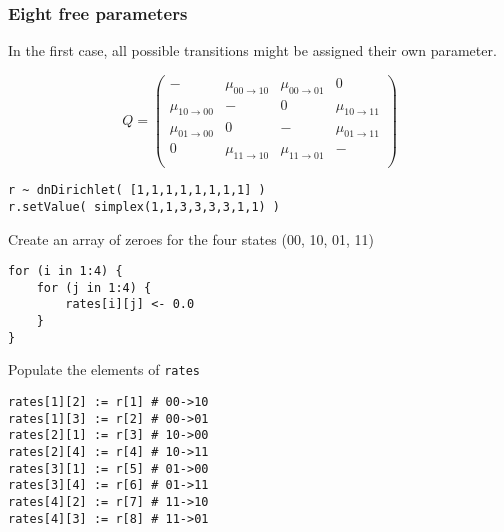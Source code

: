 \subsubsection{Eight free parameters}

In the first case, all possible transitions might be assigned their own parameter.

\begin{equation*}
Q = \begin{pmatrix}
                      - & \mu_{00 \rightarrow 10} & \mu_{00 \rightarrow 01} &                       0 \\
\mu_{10 \rightarrow 00} &                       - &                       0 & \mu_{10 \rightarrow 11} \\
\mu_{01 \rightarrow 00} &                       0 &                       - & \mu_{01 \rightarrow 11} \\
                      0 & \mu_{11 \rightarrow 10} & \mu_{11 \rightarrow 01} &                       - \\
\end{pmatrix}
\end{equation*}

{\tt \begin{snugshade*}
\begin{lstlisting}
r ~ dnDirichlet( [1,1,1,1,1,1,1,1] )
r.setValue( simplex(1,1,3,3,3,3,1,1) )
\end{lstlisting}
\end{snugshade*}}

Create an array of zeroes for the four states (00, 10, 01, 11)

{\tt \begin{snugshade*}
\begin{lstlisting}
for (i in 1:4) {
    for (j in 1:4) {
        rates[i][j] <- 0.0
    }
}
\end{lstlisting}
\end{snugshade*}}

Populate the elements of {\tt rates}

{\tt \begin{snugshade*}
\begin{lstlisting}
rates[1][2] := r[1] # 00->10
rates[1][3] := r[2] # 00->01
rates[2][1] := r[3] # 10->00
rates[2][4] := r[4] # 10->11
rates[3][1] := r[5] # 01->00
rates[3][4] := r[6] # 01->11
rates[4][2] := r[7] # 11->10
rates[4][3] := r[8] # 11->01
\end{lstlisting}
\end{snugshade*}}

